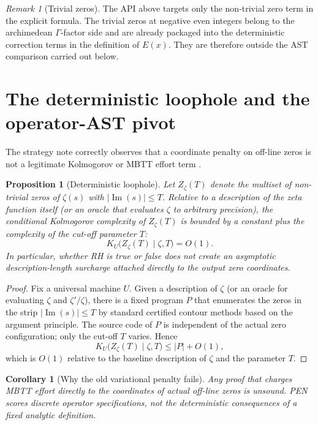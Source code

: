 \documentclass[11pt,a4paper]{article}
\theoremstyle{plain}
\newtheorem{proposition}[theorem]{Proposition}
\newtheorem{corollary}[theorem]{Corollary}
\theoremstyle{definition}
\theoremstyle{remark}
\newtheorem{remark}[theorem]{Remark}
\newcommand{\Ima}{\operatorname{Im}}
\begin{document}
\begin{remark}[Trivial zeros]
The API above targets only the non-trivial zero term in the explicit formula. The trivial zeros at negative even integers belong to the archimedean $\Gamma$-factor side and are already packaged into the deterministic correction terms in the definition of $E(x)$. They are therefore outside the AST comparison carried out below.
\end{remark}

\section{The deterministic loophole and the operator-AST pivot}

The strategy note correctly observes that a coordinate penalty on off-line zeros is not a legitimate Kolmogorov or MBTT effort term \citep{rhstrategy}.

\begin{proposition}[Deterministic loophole]
\label{prop:loophole}
Let $Z_{\zeta}(T)$ denote the multiset of non-trivial zeros of $\zeta(s)$ with $|\Ima(s)|\le T$. Relative to a description of the zeta function itself (or an oracle that evaluates $\zeta$ to arbitrary precision), the conditional Kolmogorov complexity of $Z_{\zeta}(T)$ is bounded by a constant plus the complexity of the cut-off parameter $T$:
\[
K_U\bigl(Z_{\zeta}(T)\mid \zeta,T\bigr)=O(1).
\]
In particular, whether RH is true or false does not create an asymptotic description-length surcharge attached directly to the output zero coordinates.
\end{proposition}

\begin{proof}
Fix a universal machine $U$. Given a description of $\zeta$ (or an oracle for evaluating $\zeta$ and $\zeta'/\zeta$), there is a fixed program $P$ that enumerates the zeros in the strip $|\Ima(s)|\le T$ by standard certified contour methods based on the argument principle. The source code of $P$ is independent of the actual zero configuration; only the cut-off $T$ varies. Hence
\[
K_U\bigl(Z_{\zeta}(T)\mid \zeta,T\bigr)\le |P|+O(1),
\]
which is $O(1)$ relative to the baseline description of $\zeta$ and the parameter $T$.
\end{proof}

\begin{corollary}[Why the old variational penalty fails]
Any proof that charges MBTT effort directly to the coordinates of actual off-line zeros is unsound. PEN scores discrete operator specifications, not the deterministic consequences of a fixed analytic definition.
\end{corollary}
\end{document}
